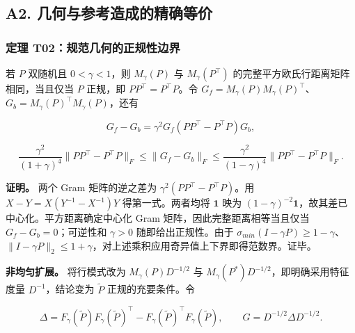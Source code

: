\documentclass[11pt,a4paper]{article}
\begin{document}
\subsection{A2.
几何与参考造成的精确等价}\label{a2.-ux51e0ux4f55ux4e0eux53c2ux8003ux9020ux6210ux7684ux7cbeux786eux7b49ux4ef7}

\subsubsection{定理
T02：规范几何的正规性边界}\label{ux5b9aux7406-t02ux89c4ux8303ux51e0ux4f55ux7684ux6b63ux89c4ux6027ux8fb9ux754c}

\par
\noindent\begin{minipage}{\linewidth}

若 \(P\) 双随机且 \(0<\gamma<1\)，则 \(M_\gamma(P)\) 与
\(M_\gamma(P^\top)\) 的完整平方欧氏行距离矩阵相同，当且仅当 \(P\)
正规，即 \(PP^\top=P^\top P\)。令
\(G_f=M_\gamma(P)M_\gamma(P)^\top\)、\(G_b=M_\gamma(P)^\top M_\gamma(P)\)，还有

\[
G_f-G_b=\gamma^2G_f(PP^\top-P^\top P)G_b,
\]

\end{minipage}\par

\[
\frac{\gamma^2}{(1+\gamma)^4}\|PP^\top-P^\top P\|_F
\le\|G_f-G_b\|_F
\le\frac{\gamma^2}{(1-\gamma)^4}\|PP^\top-P^\top P\|_F.
\]

\textbf{证明。} 两个 Gram 矩阵的逆之差为
\(\gamma^2(PP^\top-P^\top P)\)。用 \(X-Y=X(Y^{-1}-X^{-1})Y\)
得第一式。两者均将 \(\mathbf1\) 映为
\((1-\gamma)^{-2}\mathbf1\)，故其差已中心化。平方距离确定中心化 Gram
矩阵，因此完整距离相等当且仅当 \(G_f-G_b=0\)；可逆性和 \(\gamma>0\)
随即给出正规性。由于
\(\sigma_{min}(I-\gamma P)\ge1-\gamma\)、\(\|I-\gamma P\|_2\le1+\gamma\)，对上述乘积应用奇异值上下界即得范数界。证毕。

\par
\noindent\begin{minipage}{\linewidth}

\textbf{非均匀扩展。} 将行模式改为 \(M_\gamma(P)D^{-1/2}\) 与
\(M_\gamma(P^*)D^{-1/2}\)，即明确采用特征度量 \(D^{-1}\)，结论变为
\(\widetilde P\) 正规的充要条件。令

\[
\Delta=F_\gamma(\widetilde P)F_\gamma(\widetilde P)^\top-
F_\gamma(\widetilde P)^\top F_\gamma(\widetilde P),
\qquad G=D^{-1/2}\Delta D^{-1/2}.
\]

\end{minipage}\par
\end{document}
